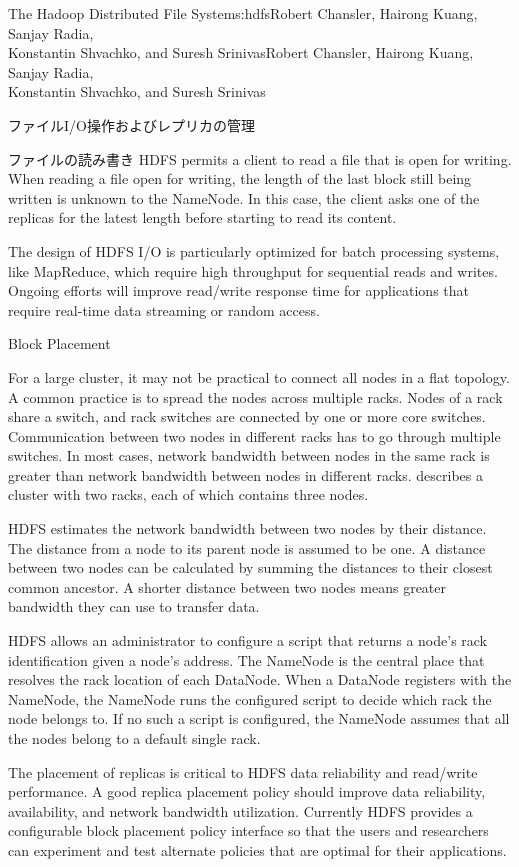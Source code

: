 \begin{aosachaptertoc}{The Hadoop Distributed File System}{s:hdfs}{Robert Chansler, Hairong Kuang, Sanjay Radia, \\ Konstantin Shvachko, and Suresh Srinivas}{Robert Chansler, Hairong Kuang, Sanjay Radia, \\ \hspace*{0.9cm} Konstantin Shvachko, and Suresh Srinivas}
\begin{aosasect1}{ファイルI/O操作およびレプリカの管理}
\begin{aosasect2}{ファイルの読み書き}
HDFS permits a client to read a file that is open for writing. When
reading a file open for writing, the length of the last block still
being written is unknown to the NameNode. In this case, the client
asks one of the replicas for the latest length before starting to read
its content.

The design of HDFS I/O is particularly optimized for batch processing
systems, like MapReduce, which require high throughput for sequential
reads and writes. Ongoing efforts will improve read/write response
time for applications that require real-time data streaming or random
access.

\end{aosasect2}

\begin{aosasect2}{Block Placement}

For a large cluster, it may not be practical to connect all nodes in a
flat topology. A common practice is to spread the nodes across
multiple racks. Nodes of a rack share a switch, and rack switches are
connected by one or more core switches. Communication between two
nodes in different racks has to go through multiple switches. In most
cases, network bandwidth between nodes in the same rack is greater
than network bandwidth between nodes in different racks.
 describes a cluster with two racks, each of
which contains three nodes.


HDFS estimates the network bandwidth between two nodes by their
distance. The distance from a node to its parent node is assumed to be
one. A distance between two nodes can be calculated by summing the
distances to their closest common ancestor.  A shorter distance
between two nodes means greater bandwidth they can use to transfer
data.

HDFS allows an administrator to configure a script that returns a
node's rack identification given a node's address. The NameNode is the
central place that resolves the rack location of each DataNode. When a
DataNode registers with the NameNode, the NameNode runs the configured
script to decide which rack the node belongs to. If no such a script
is configured, the NameNode assumes that all the nodes belong to a
default single rack.

The placement of replicas is critical to HDFS data reliability and
read/write performance. A good replica placement policy should improve
data reliability, availability, and network bandwidth
utilization. Currently HDFS provides a configurable block placement
policy interface so that the users and researchers can experiment and
test alternate policies that are optimal for their applications.


\end{aosasect2}
\end{aosasect1}
\end{aosachaptertoc}
